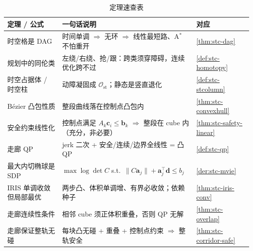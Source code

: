 \begin{table}[H]\centering\small
\caption{定理速查表}
\label{tab:stc-theorems}
\begin{tabular}{lll}
\toprule
定理 / 公式 & 一句话说明 & 对应 \\
\midrule
时空格是 DAG & 时间单调 $\Rightarrow$ 无环 $\Rightarrow$ 线性最短路、A$^*$ 不怕重开 & \cref{thm:stc-dag} \\
规划中的同伦类 & 左绕/右绕、抢/跟：跨类须穿障碍，连续优化跨不过 & \cref{def:stc-homotopy} \\
时空占据体 / 时空柱 & 动障凝固成 $\mathcal{O}_{\mathrm{st}}$；静态是竖直退化 & \cref{def:stc-stcolumn} \\
Bézier 凸包性质 & 整段曲线落在控制点凸包内 & \cref{thm:stc-convexhull} \\
安全约束线性化 & 控制点满足 $A_k\mathbf{c}_i\le\mathbf{b}_k$ $\Rightarrow$ 整段在 cube 内（充分，非必要） & \cref{thm:stc-safety-linear} \\
走廊 QP & jerk 二次 + 安全/连续/边界全线性 = 凸 QP & \cref{def:stc-qp} \\
最大内切椭球是 SDP & $\max\log\det C$ s.t.\ $\|C\mathbf{a}_j\|+\mathbf{a}_j^\top\mathbf{d}\le b_j$ & \cref{der:stc-mvie} \\
IRIS 单调收敛但局部最优 & 两步凸、体积单调增、有界必收敛；依赖种子 & \cref{thm:stc-iris-conv} \\
走廊连续性条件 & 相邻 cube 须正体积重叠，否则 QP 无解 & \cref{thm:stc-overlap} \\
走廊保证整轨无碰 & 每块凸无碰 + 重叠 + 控制点约束 $\Rightarrow$ 整轨安全 & \cref{thm:stc-corridor-safe} \\
\bottomrule
\end{tabular}
\end{table}

